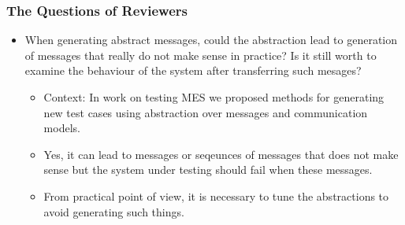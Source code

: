 \documentclass{beamer}
\newcommand{\hlgr}[1]{\textcolor{olive!50!green}{#1}}
\begin{document}
\begin{frame}[noframenumbering]
	\frametitle{The Questions of Reviewers}
	\begin{itemize}
	  \item \hlgr{When generating abstract messages, could the abstraction lead to generation of messages that really do not make sense in practice? Is it still worth to examine the behaviour of the system after transferring such mesages?}
	  \begin{itemize}
            \item Context: In work on testing MES we proposed methods for generating new test cases using abstraction over messages and communication models.
            \item Yes, it can lead to messages or seqeunces of messages that does not make sense but the system under testing should fail when these messages.
            \item From practical point of view, it is necessary to tune the abstractions to avoid generating such things.
	  \end{itemize}
	\end{itemize}
\end{frame}
\end{document}
